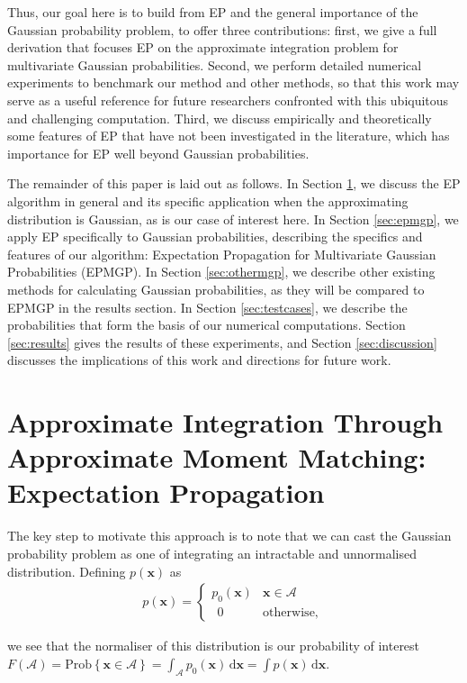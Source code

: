 \documentclass[twoside,11pt]{article}
\def\x{{\mathbf x}}
\def\regionA{\mathcal{A}}
\renewcommand{\d}{\,\mathrm{d}}
\begin{document}
Thus, our goal here is to build from EP and the general importance of the Gaussian probability problem, to offer three contributions: first, we give a full derivation that focuses EP on the approximate integration problem for multivariate Gaussian probabilities.  Second, we perform detailed numerical experiments to benchmark our method and other methods, so that this work may serve as a useful reference for future researchers confronted with this ubiquitous and challenging computation.  Third, we discuss empirically and theoretically some features of EP that have not been investigated in the literature, which has importance for EP well beyond Gaussian probabilities.

The remainder of this paper is laid out as follows.  In Section \ref{sec:ep}, we discuss the EP algorithm in general and its specific application when the approximating distribution is Gaussian, as is our case of interest here.  In Section \ref{sec:epmgp}, we apply EP specifically to Gaussian probabilities, describing the specifics and features of our algorithm: Expectation Propagation for Multivariate Gaussian Probabilities (EPMGP).  In Section \ref{sec:othermgp}, we describe other existing methods for calculating Gaussian probabilities, as they will be compared to EPMGP in the results section.  In Section \ref{sec:testcases}, we describe the probabilities that form the basis of our numerical computations.  Section \ref{sec:results} gives the results of these experiments, and Section \ref{sec:discussion} discusses the implications of this work and directions for future work.

\section{Approximate Integration Through Approximate Moment Matching: Expectation Propagation}
\label{sec:ep}

The key step to motivate this approach is to note that we can cast the Gaussian probability problem as one of integrating an intractable and unnormalised distribution.  Defining $p(\x)$ as 
%
\begin{gather}
\label{eqn:trunc2}
p(\x) = \begin{cases} 
p_0(\x) & \x \in \regionA \\
~~0~~ & \mathrm{otherwise,} 
\end{cases}
\end{gather}

\noindent we see that the normaliser of this distribution is our probability of interest $F(\regionA) = \mathrm{Prob}\left\{\x\in \regionA\right\} = \int_\regionA p_0(\x)\d\x = \int p(\x) \d\x$.
\end{document}
